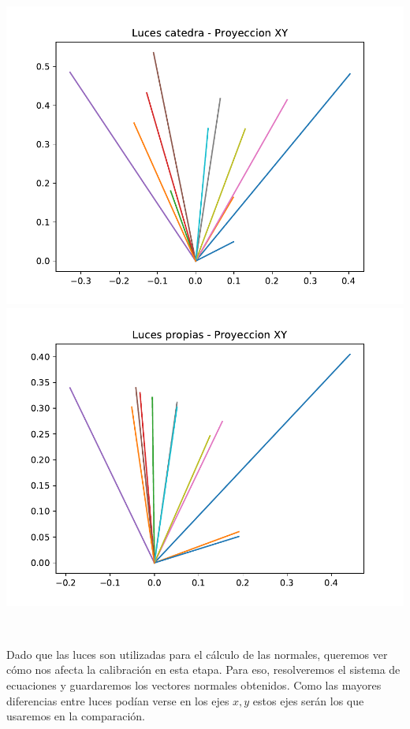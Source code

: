 {\centering
    \includegraphics[scale=0.8]{informe/imagenes/lucesCatedraProyeccionXY.pdf} \\
}
{\centering
    \includegraphics[scale=0.8]{informe/imagenes/lucesPropiasProyeccionXY.pdf} \\
}

$ $\newline


Dado que las luces son utilizadas para el cálculo de las normales, queremos ver cómo nos afecta la calibración en esta etapa. Para eso, resolveremos el sistema de ecuaciones y guardaremos los vectores normales obtenidos. Como las mayores diferencias entre luces podían verse en los ejes $x, y$ estos ejes serán los que usaremos en la comparación. \\

